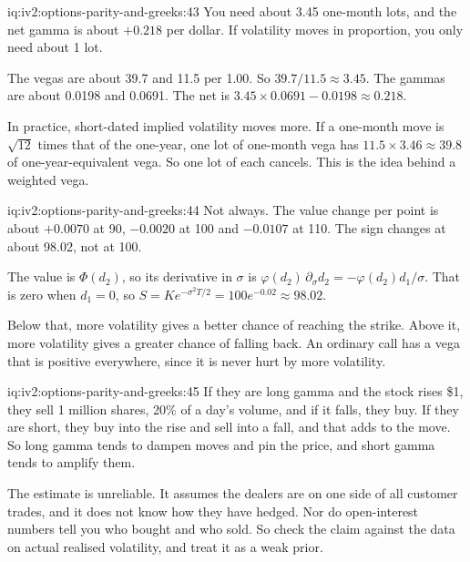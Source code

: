 \begin{solution}{iq:iv2:options-parity-and-greeks:43}
You need about 3.45 one-month lots, and the net gamma is about $+0.218$ per dollar. If volatility moves in proportion, you only need about 1 lot.

The vegas are about 39.7 and 11.5 per 1.00. So $39.7/11.5 \approx 3.45$. The gammas are about 0.0198 and 0.0691. The net is $3.45 \times 0.0691 - 0.0198 \approx 0.218$.

In practice, short-dated implied volatility moves more. If a one-month move is $\sqrt{12}$ times that of the one-year, one lot of one-month vega has $11.5 \times 3.46 \approx 39.8$ of one-year-equivalent vega. So one lot of each cancels. This is the idea behind a weighted vega.

\end{solution}

\begin{solution}{iq:iv2:options-parity-and-greeks:44}
Not always. The value change per point is about $+0.0070$ at 90, $-0.0020$ at 100 and $-0.0107$ at 110. The sign changes at about 98.02, not at 100.

The value is $\Phi(d_2)$, so its derivative in $\sigma$ is $\varphi(d_2)\,\partial_\sigma d_2 = -\varphi(d_2)d_1/\sigma$. That is zero when $d_1 = 0$, so $S = Ke^{-\sigma^2T/2} = 100e^{-0.02} \approx 98.02$.

Below that, more volatility gives a better chance of reaching the strike. Above it, more volatility gives a greater chance of falling back. An ordinary call has a vega that is positive everywhere, since it is never hurt by more volatility.

\end{solution}

\begin{solution}{iq:iv2:options-parity-and-greeks:45}
If they are long gamma and the stock rises \$1, they sell 1 million shares, 20\% of a day's volume, and if it falls, they buy. If they are short, they buy into the rise and sell into a fall, and that adds to the move. So long gamma tends to dampen moves and pin the price, and short gamma tends to amplify them.

The estimate is unreliable. It assumes the dealers are on one side of all customer trades, and it does not know how they have hedged. Nor do open-interest numbers tell you who bought and who sold. So check the claim against the data on actual realised volatility, and treat it as a weak prior.

\end{solution}

